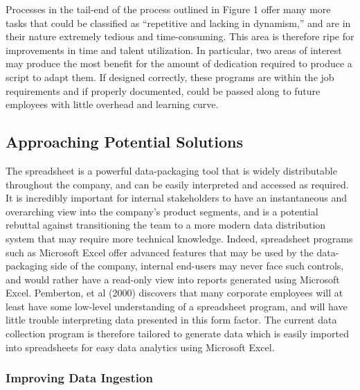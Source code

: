 \documentclass[12pt]{article}
\begin{document}
\indent\hspace{0.5in} Processes in the tail-end of the process outlined in Figure 1 offer many more tasks that could be classified as “repetitive and lacking in dynamism,” and are in their nature extremely tedious and time-consuming. This area is therefore ripe for improvements in time and talent utilization. In particular, two areas of interest may produce the most benefit for the amount of dedication required to produce a script to adapt them. If designed correctly, these programs are within the job requirements and if properly documented, could be passed along to future employees with little overhead and learning curve. 

\subsection{Approaching Potential Solutions}

\indent\hspace{0.5in} The spreadsheet is a powerful data-packaging tool that is widely distributable throughout the company, and can be easily interpreted and accessed as required. It is incredibly important for internal stakeholders to have an instantaneous and overarching view into the company's product segments, and is a potential rebuttal against transitioning the team to a more modern data distribution system that may require more technical knowledge. Indeed, spreadsheet programs such as Microsoft Excel offer advanced features that may be used by the data-packaging side of the company, internal end-users may never face such controls, and would rather have a read-only view into reports generated using Microsoft Excel. Pemberton, et al (2000) discovers that many corporate employees will at least have some low-level understanding of a spreadsheet program, and will have little trouble interpreting data presented in this form factor. The current data collection program is therefore tailored to generate data which is easily imported into spreadsheets for easy data analytics using Microsoft Excel.

\subsubsection{Improving Data Ingestion}
\end{document}

